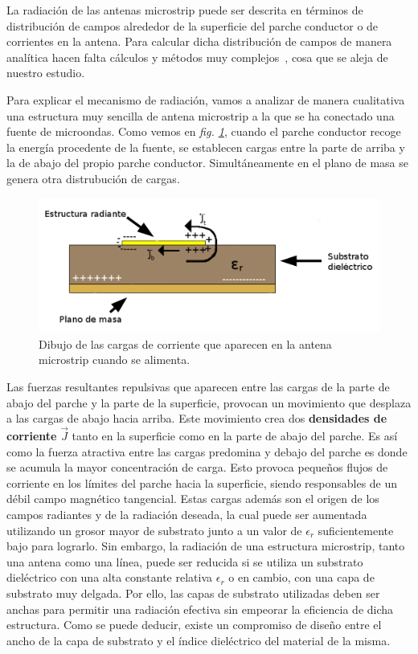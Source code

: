 La radiación de las antenas microstrip puede ser descrita en términos de distribución de campos alrededor de la superficie del parche conductor o de corrientes en la antena. Para calcular dicha distribución de campos de manera analítica hacen falta cálculos y métodos muy complejos~\cite{balanis14}, cosa que se aleja de nuestro estudio.

Para explicar el mecanismo de radiación, vamos a analizar de manera cualitativa una estructura muy sencilla de antena microstrip a la que se ha conectado una fuente de microondas. Como vemos en \textit{fig. \ref{fig:fig2.2}}, cuando el parche conductor recoge la energía procedente de la fuente, se establecen cargas entre la parte de arriba y la de abajo del propio parche conductor. Simultáneamente en el plano de masa se genera otra distrubución de cargas.

\begin{figure}[!htb]
    \centering
    \includegraphics[scale=0.4]{./ContextoTecnologico/cargas_parche_4}
    \caption{Dibujo de las cargas de corriente que aparecen en la antena microstrip cuando se alimenta.}
    \label{fig:fig2.2}
\end{figure}

Las fuerzas resultantes repulsivas que aparecen entre las cargas de la parte de abajo del parche y la parte de la superficie, provocan un movimiento que desplaza a las cargas de abajo hacia arriba. Este movimiento crea dos \textbf{densidades de corriente} $\vec{J}$ tanto en la superficie como en la parte de abajo del parche. Es así como la fuerza atractiva entre las cargas predomina y debajo del parche es donde se acumula la mayor concentración de carga. Esto provoca pequeños flujos de corriente en los límites del parche hacia la superficie, siendo responsables de un débil campo magnético tangencial. Estas cargas además son el origen de los campos radiantes y de la radiación deseada, la cual puede ser aumentada utilizando un grosor mayor de substrato junto a un valor de $\epsilon_{r}$ suficientemente bajo para lograrlo. Sin embargo, la radiación de una estructura microstrip, tanto una antena como una línea, puede ser reducida si se utiliza un substrato dieléctrico con una alta constante relativa $\epsilon_r$ o en cambio, con una capa de substrato muy delgada. Por ello, las capas de substrato utilizadas deben ser anchas para permitir una radiación efectiva sin empeorar la eficiencia de dicha estructura. Como se puede deducir, existe un compromiso de diseño entre el ancho de la capa de substrato y el índice dieléctrico del material de la misma.


